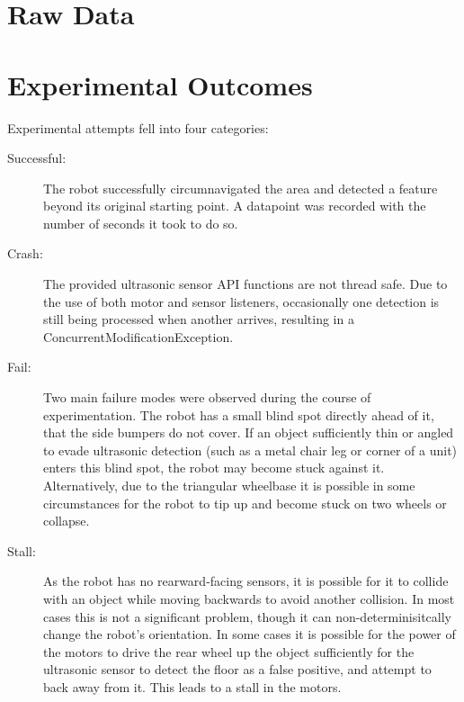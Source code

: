\documentclass[a4paper,12pt]{article}
\begin{document}



\appendix
\section{Raw Data}\label{app:data}



\section{Experimental Outcomes}\label{app:fail}
Experimental attempts fell into four categories:
\begin{description}
	\item [Successful:] The robot successfully circumnavigated the area and detected a feature beyond its original starting point. A datapoint was recorded with the number of seconds it took to do so.
	\item [Crash:] The provided ultrasonic sensor API functions are not thread safe. Due to the use of both motor and sensor listeners, occasionally one detection is still being processed when another arrives, resulting in a ConcurrentModificationException.
	\item [Fail:] Two main failure modes were observed during the course of experimentation. The robot has a small blind spot directly ahead of it, that the side bumpers do not cover. If an object sufficiently thin or angled to evade ultrasonic detection (such as a metal chair leg or corner of a unit) enters this blind spot, the robot may become stuck against it. Alternatively, due to the triangular wheelbase it is possible in some circumstances for the robot to tip up and become stuck on two wheels or collapse.
	\item [Stall:] As the robot has no rearward-facing sensors, it is possible for it to collide with an object while moving backwards to avoid another collision. In most cases this is not a significant problem, though it can non-determinisitcally change the robot's orientation. In some cases it is possible for the power of the motors to drive the rear wheel up the object sufficiently for the ultrasonic sensor to detect the floor as a false positive, and attempt to back away from it. This leads to a stall in the motors.
\end{description}

\end{document}
